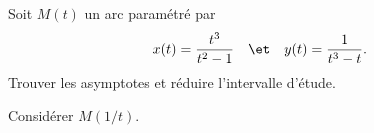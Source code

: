 \begin{enonce}
\begin{exercise}[ID={RMS126 E526},subtitle={Mines-Ponts PSI 2015},tags={}, difficulty={0}]
Soit $M(t)$ un arc paramétré par
\begin{equation*}
  x(t) = \frac{t^3}{t^2-1} \quad\et\quad y(t)=\frac{1}{t^3-t}.
\end{equation*}
Trouver les asymptotes et réduire l'intervalle d'étude.
\begin{hint}
Considérer $M\left( 1/t \right)$.
\end{hint}
\end{exercise}
\begin{solution}
\end{solution}
\end{enonce}

